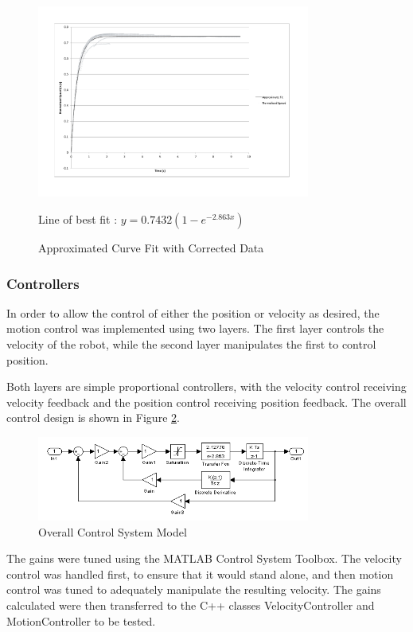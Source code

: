 \documentclass[10pt]{article}
\begin{document}
\begin{figure}
 \centering
 \includegraphics[width=0.8\textwidth]{Images/approximate-fit-model-time-shift}
 \caption{Approximated Curve Fit with Corrected Data}
 \label{fig:approximateFitTimeShiftRemoved}

 Line of best fit : $y=0.7432 \left(1-e^{-2.863x}\right)$
\end{figure}

\subsubsection{Controllers}

In order to allow the control of either the position or velocity as desired, the
motion control was implemented using two layers.  The first layer controls the
velocity of the robot, while the second layer manipulates the first to control
position.

Both layers are simple proportional controllers, with the velocity control
receiving velocity feedback and the position control receiving position
feedback.  The overall control design is shown in Figure
\ref{fig:overalController}.

\begin{figure}
 \includegraphics[width=0.8\textwidth]{Images/main-model}
 \caption{Overall Control System Model}
 \label{fig:overalController}
\end{figure}

The gains were tuned using the MATLAB Control System Toolbox. The velocity
control was handled first, to ensure that it would stand alone, and then motion
control was tuned to adequately manipulate the resulting velocity.  The gains
calculated were then transferred to the C++ classes VelocityController and
MotionController to be tested.
\end{document}
